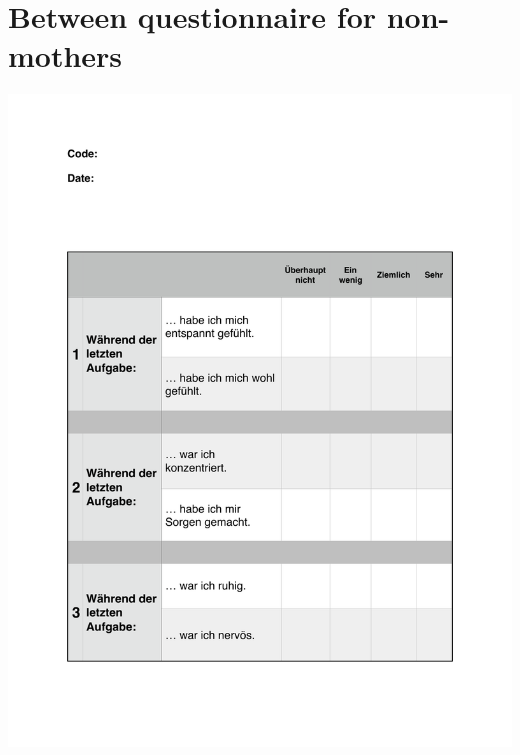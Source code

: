 \chapter{Between questionnaire for non-mothers}\label{appendix.between.nonmother}
\begin{center}
\includegraphics[page=1,scale=0.8,trim={60 90 0 90},clip]{"Appendix/Between_Task_Questions_Non-Mothers"}
\end{center}


